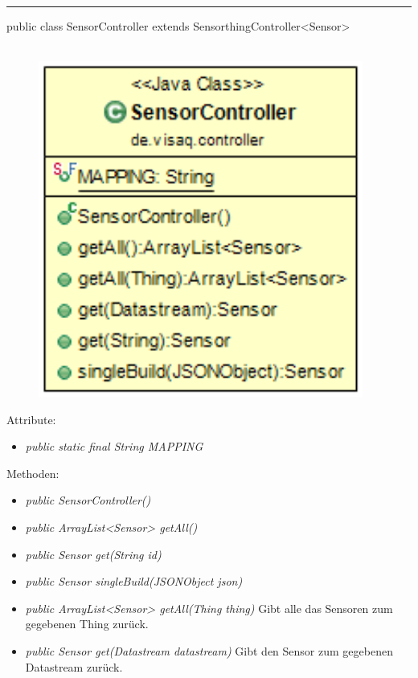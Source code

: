 \rule{\textwidth}{0.4pt}
public class SensorController extends SensorthingController<Sensor>
\\\\
\begin{minipage}{0.4\textwidth}
    \begin{figure}[H]
        {\centering\includegraphics[width=0.95\textwidth]{media/backend/controller/classes/SensorController.png}}
    \end{figure}
    \end{minipage} \hfill
\begin{minipage}{0.6\textwidth}
\end{minipage}

Attribute:
\begin{itemize}
    \item \emph{public static final String MAPPING} \mappingDescription
\end{itemize}
Methoden:
\begin{itemize}
    \item \emph{public SensorController()}
    \item \emph{public ArrayList<Sensor> getAll()}
    \extendsSensorthingController
    \item \emph{public Sensor get(String id)}
    \extendsSensorthingController
    \item \emph{public Sensor singleBuild(JSONObject json)}
    \extendsSensorthingController
    \item \emph{public ArrayList<Sensor> getAll(Thing thing)}
    Gibt alle das Sensoren zum gegebenen Thing zurück.
    \item \emph{public Sensor get(Datastream datastream)}
    Gibt den Sensor zum gegebenen Datastream zurück.
\end{itemize}


